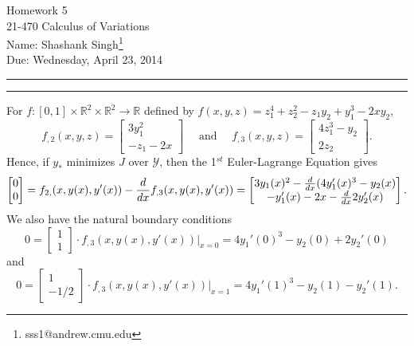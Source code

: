 \documentclass[11pt]{article}
\makeatletter
\newcounter{questionCounter}
\newcounter{partCounter}[questionCounter]
\newenvironment{question}[2][\arabic{questionCounter}]{%
    \setcounter{partCounter}{0}%
    \vspace{.25in} \hrule \vspace{0.5em}%
        \noindent{\bf #2}%
    \vspace{0.8em} \hrule \vspace{.10in}%
    \addtocounter{questionCounter}{1}%
}{}
\newcommand{\myname}{Shashank Singh\footnote{sss1@andrew.cmu.edu}}
\newcommand{\myclass}{21-470 Calculus of Variations}
\newcommand{\myhwnum}{5}
\newcommand{\duedate}{Wednesday, April 23, 2014}
\newcommand{\R}{\mathbb{R}}             %
\newcommand{\Y}{\mathscr{Y}}            %
\makeatother
\begin{document}
\thispagestyle{plain}

{\Large Homework \myhwnum} \\
\myclass \\
Name: \myname \\
Due: \duedate

\begin{question}{Problem 1}
For $f : [0,1] \times \R^2 \times \R^2 \to \R$ defined by
$f(x,y,z) = z_1^4 + z_2^2 - z_1y_2 + y_1^3 - 2xy_2$,
\[f_{,2}(x,y,z)
    =   \begin{bmatrix}
            3y_1^2   \\
            -z_1 - 2x
        \end{bmatrix}
    \quad \mbox{ and } \quad
    f_{,3}(x,y,z)
    =   \begin{bmatrix}
            4z_1^3 - y_2    \\
            2z_2
        \end{bmatrix}.
\]
Hence, if $y_*$ minimizes $J$ over $\Y$, then the 1$^{st}$ Euler-Lagrange
Equation gives
\[
    \begin{bmatrix}
        0   \\
        0
    \end{bmatrix}
    = f_{2,}(x,y(x),y'(x)) - \frac{d}{dx} f_{,3}(x,y(x),y'(x))  \\
    =
\begin{bmatrix}
  3y_1(x)^2 - \frac{d}{dx} (4y_1'(x)^3 - y_2(x)\\
  - y_1'(x) - 2x - \frac{d}{dx} 2y_2'(x)
\end{bmatrix}.
\]
We also have the natural boundary conditions
\[0
    =   \begin{bmatrix}
            1   \\
            1
        \end{bmatrix} \cdot
        f_{,3}(x,y(x),y'(x)) \bigg|_{x = 0}
    = 4y_1'(0)^3 - y_2(0) + 2y_2'(0)
\]
and
\[0
    =   \begin{bmatrix}
            1   \\
            -1/2
        \end{bmatrix} \cdot
        f_{,3}(x,y(x),y'(x)) \bigg|_{x = 1}
    = 4y_1'(1)^3 - y_2(1) - y_2'(1).
\]
\end{question}
\end{document}
